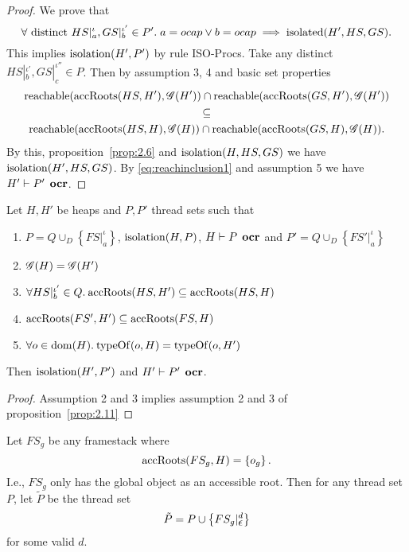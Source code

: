 \begin{proof}
  We prove that 
  \begin{equation*}
    \forall \text{ distinct } HS|_a^\iota, GS|_b^{\iota'} \in P'.\; a = \mbox{$ocap$} \lor b = \mbox{$ocap$} \implies
    \mbox{$\mathrm{isolated}$}(H', HS, GS).
  \end{equation*}
  This implies $\mbox{$\mathrm{isolation}$}(H', P')$ by rule {\sc ISO-Procs}.
  Take any distinct $HS|_b^{\iota'}, GS|_c^{\iota''} \in P$. Then by assumption 3, 4 and basic set
  properties
  \begin{equation} \label{eq:reachinclusion1}
    \begin{gathered}
      \mbox{$\mathrm{reachable}$}(\mbox{$\mathrm{accRoots}$}(HS, H'), \mathscr{G}(H')) \cap \mbox{$\mathrm{reachable}$}(\mbox{$\mathrm{accRoots}$}(GS, H'),
      \mathscr{G}(H')) \\
      \subseteq \\
      \mbox{$\mathrm{reachable}$}(\mbox{$\mathrm{accRoots}$}(HS, H), \mathscr{G}(H)) \cap \mbox{$\mathrm{reachable}$}(\mbox{$\mathrm{accRoots}$}(GS, H),
      \mathscr{G}(H)).
    \end{gathered}
  \end{equation}
  By this, proposition~\ref{prop:2.6} and $\mbox{$\mathrm{isolation}$}(H, HS, GS)$ we have
  $\mbox{$\mathrm{isolation}$}(H', HS, GS)$. By \eqref{eq:reachinclusion1} and assumption 5
  we have $H' \vdash P' \:\: \mbox{\bf ocr}$.
\end{proof}

\begin{corollary} \label{cor:2.11}
  Let $H, H'$ be heaps and $P, P'$ thread sets such that
  \begin{enumerate}
    \item $P = Q \cup_D \left\{ FS|_a^\iota \right\}$, $\mbox{$\mathrm{isolation}$}{(H, P)}$, $H
      \vdash P \:\: \mbox{\bf ocr}$ and $P' = Q \cup_D \left\{ FS'|_a^\iota \right\}$
    \item $\mathscr{G}{(H)} = \mathscr{G}{(H')}$
    \item $\forall HS|_b^{\iota'} \in Q. \: \mbox{$\mathrm{accRoots}$}{(HS, H')} \subseteq \mbox{$\mathrm{accRoots}$}{(HS, H)}$
    \item $\mbox{$\mathrm{accRoots}$}{(FS', H')} \subseteq \mbox{$\mathrm{accRoots}$}{(FS, H)}$
    \item $\forall o \in \mbox{$\mathrm{dom}$}{(H)}. \: \mbox{$\mathrm{typeOf}$}{(o, H)} = \mbox{$\mathrm{typeOf}$}{(o, H')}$
  \end{enumerate}
  Then $\mbox{$\mathrm{isolation}$}{(H', P')}$ and $H' \vdash P' \:\: \mbox{\bf ocr}$.
\end{corollary}

\begin{proof}
  Assumption 2 and 3 implies assumption 2 and 3 of
  proposition~\ref{prop:2.11}
\end{proof}

\begin{definition} \label{def:ptilde}
  Let $FS_g$ be any framestack where 
  \begin{equation*}
    \mbox{$\mathrm{accRoots}$}(FS_g, H) = \left\{ o_g \right\}.
  \end{equation*}
  I.e., $FS_g$ only has the global object as an accessible root.  Then for
  any thread set $P$, let $\tilde{P}$ be the thread set
  \begin{equation*}
    \tilde{P} = P \cup \left\{ FS_g|_{\mbox{$\epsilon$}}^d \right\}
  \end{equation*}
  for some valid $d$.
\end{definition}

